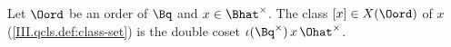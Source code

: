Let $\Oord$ be an order of $\Bq$ and $x\in\Bhat^\times$. The class $[x]\in X(\Oord)$ of $x$ (\cref{III.qcls.def:class-set}) is the double coset $\iota(\Bq^\times)\,x\,\Ohat^\times$.
